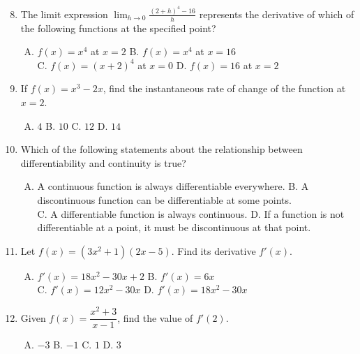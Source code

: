 \documentclass[11pt,a4paper]{article}
\begin{document}
\begin{enumerate}[1.]
    \setcounter{enumi}{7}
    \item The limit expression $\displaystyle \lim_{h \to 0} \frac{(2+h)^4 - 16}{h}$ represents the derivative of which of the following functions at the specified point?
    \begin{enumerate}[A.]
        \item $f(x) = x^4$ at $x = 2$ \qquad B. $f(x) = x^4$ at $x = 16$ \\ C. $f(x) = (x+2)^4$ at $x = 0$ \qquad D. $f(x) = 16$ at $x = 2$
    \end{enumerate}

    \item If $f(x) = x^3 - 2x$, find the instantaneous rate of change of the function at $x = 2$.
    \begin{enumerate}[A.]
        \item $4$ \qquad B. $10$ \qquad C. $12$ \qquad D. $14$
    \end{enumerate}

    \item Which of the following statements about the relationship between differentiability and continuity is true?
    \begin{enumerate}[A.]
        \item A continuous function is always differentiable everywhere. \qquad B. A discontinuous function can be differentiable at some points. \\ C. A differentiable function is always continuous. \qquad D. If a function is not differentiable at a point, it must be discontinuous at that point.
    \end{enumerate}

    \item Let $f(x) = (3x^2 + 1)(2x - 5)$. Find its derivative $f'(x)$.
    \begin{enumerate}[A.]
        \item $f'(x) = 18x^2 - 30x + 2$ \qquad B. $f'(x) = 6x$ \\ C. $f'(x) = 12x^2 - 30x$ \qquad D. $f'(x) = 18x^2 - 30x$
    \end{enumerate}

    \item Given $f(x) = \dfrac{x^2 + 3}{x - 1}$, find the value of $f'(2)$.
    \begin{enumerate}[A.]
        \item $-3$ \qquad B. $-1$ \qquad C. $1$ \qquad D. $3$
    \end{enumerate}


\end{enumerate}
\end{document}
